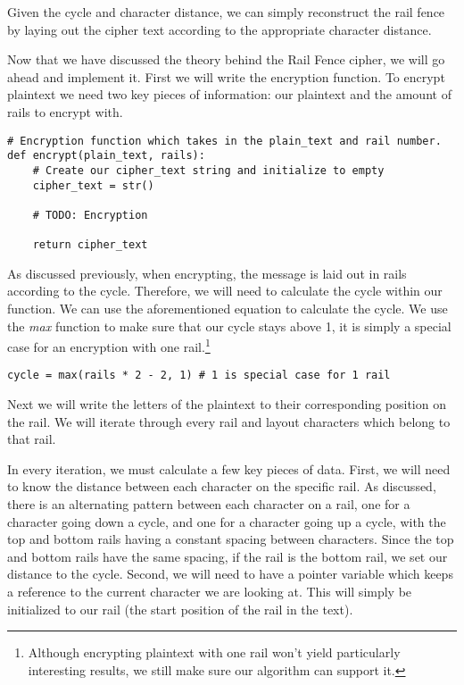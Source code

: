 Given the cycle and character distance, we can simply reconstruct the rail fence by laying out the cipher
text according to the appropriate character distance. 

Now that we have discussed the theory behind the Rail Fence cipher, we will go ahead and implement it.
First we will write the encryption function. To encrypt plaintext we need two key pieces of information:
our plaintext and the amount of rails to encrypt with. 

\begin{verbatim}
# Encryption function which takes in the plain_text and rail number.
def encrypt(plain_text, rails):
    # Create our cipher_text string and initialize to empty
    cipher_text = str()

    # TODO: Encryption

    return cipher_text
\end{verbatim}

As discussed previously, when encrypting, the message is laid out in rails according to the cycle. 
Therefore, we will need to calculate the cycle within our function. 
We can use the aforementioned equation to calculate the cycle. We use the \textit{max} function to 
make sure that our cycle stays above 1, it is simply a special case for an encryption with one rail.\footnote{Although 
encrypting plaintext with one rail won't yield particularly interesting results, we still make sure our algorithm can support it.}

\begin{verbatim}
cycle = max(rails * 2 - 2, 1) # 1 is special case for 1 rail    
\end{verbatim}

Next we will write the letters of the plaintext to their corresponding position on the rail. 
We will iterate through every rail and layout characters which belong to that rail. 

In every iteration, we must calculate a few key pieces of data. First, we will need to know the distance between 
each character on the specific rail. As discussed, there is an alternating pattern between each character on a rail,
one for a character going down a cycle, and one for a character going up a cycle, with the top and bottom rails
having a constant spacing between characters. Since the top and bottom rails have the same spacing, if the rail
is the bottom rail, we set our distance to the cycle. Second, we will need to have a pointer variable which
keeps a reference to the current character we are looking at. This will simply be initialized to our rail (the start position
of the rail in the text). 

